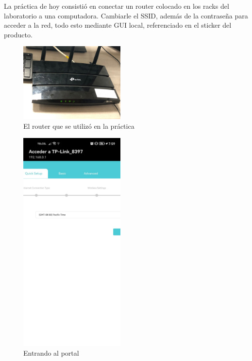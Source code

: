 \documentclass[11pt]{article}
\author{Diego Domínguez}
\date{\today}
\title{}
\begin{document}
La práctica de hoy consistió en conectar un router colocado
en los racks del laboratorio a una computadora. Cambiarle el SSID,
además de la contraseña para acceder a la red, todo esto mediante
GUI local, referenciado en el sticker del producto.

\begin{figure}[htbp]
\centering
\includegraphics[width=200px]{./modem.jpeg}
\caption{El router que se utilizó en la práctica}
\end{figure}

\begin{figure}[htbp]
\centering
\includegraphics[width=200px]{./portal.jpeg}
\caption{Entrando al portal}
\end{figure}
\end{document}
